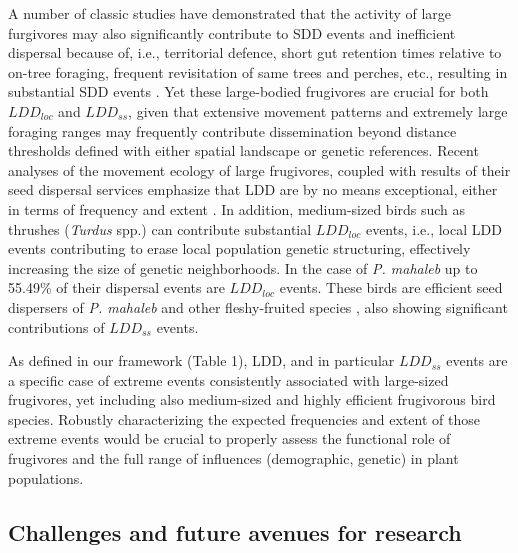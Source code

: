 \documentclass[a4paper, 12pt]{article}
\begin{document}
\begin{linenumbers}
A number of classic studies have demonstrated that the activity of large furgivores may also significantly contribute to SDD events and inefficient dispersal because of, i.e., territorial defence, short gut retention times relative to on-tree foraging, frequent revisitation of same trees and perches, etc., resulting in substantial SDD events \citep{Pratt:1983gf,Pratt:1984ly,Snow:1984ul,Snow:1988ve,Wheelwright:1991qf}. Yet these large-bodied frugivores are crucial for both $LDD_{loc}$ and $LDD_{ss}$, given that extensive movement patterns and extremely large foraging ranges may frequently contribute dissemination beyond distance thresholds defined with either spatial landscape or genetic references. Recent analyses of the movement ecology of large frugivores, coupled with results of their seed dispersal services emphasize that LDD are by no means exceptional, either in terms of frequency and extent \citep[e.g., ][]{Westcott:2005,Bueno:2013cg,Morales:2013dg,Carlo:2013vd}. In addition, medium-sized birds such as thrushes (\textit{Turdus} spp.) can contribute substantial $LDD_{loc}$ events, i.e., local LDD events contributing to erase local population genetic structuring, effectively increasing the size of genetic neighborhoods. In the case of \textit{P. mahaleb} up to 55.49\% of their dispersal events are $LDD_{loc}$ events. These birds are efficient seed dispersers of \textit{P. mahaleb} and other fleshy-fruited species \citep{Snow:1988ve,Jordano:2000ft,Carlo:2013vd}, also showing significant contributions of $LDD_{ss}$ events.

As defined in our framework (Table 1), LDD, and in particular $LDD_{ss}$ events are a specific case of extreme events \citep{Garcia:2017aa} consistently associated with large-sized frugivores, yet including also medium-sized and highly efficient frugivorous bird species. Robustly characterizing the expected frequencies and extent of those extreme events would be crucial to properly assess the functional role of frugivores and the full range of influences (demographic, genetic) in plant populations.


\subsection*{Challenges and future avenues for research}


\end{linenumbers}
\end{document}
